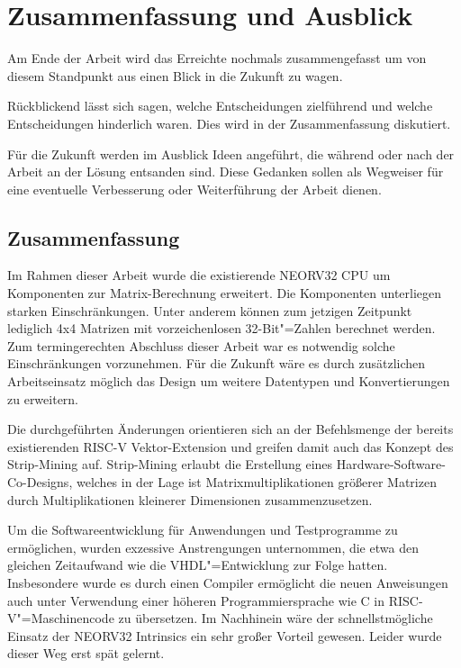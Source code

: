 \chapter{Zusammenfassung und Ausblick} \label{chpt:Zusammenfassung_und_Ausblick_Main}

Am Ende der Arbeit wird das Erreichte nochmals zusammengefasst um von diesem Standpunkt aus einen Blick in die Zukunft zu wagen.

Rückblickend lässt sich sagen, welche Entscheidungen zielführend und welche Entscheidungen hinderlich waren. Dies wird in der Zusammenfassung diskutiert.

Für die Zukunft werden im Ausblick Ideen angeführt, die während oder nach der Arbeit an der Lösung entsanden sind. Diese Gedanken sollen als Wegweiser für eine eventuelle Verbesserung oder Weiterführung der Arbeit dienen.




\section{Zusammenfassung} \label{sec:summary}

Im Rahmen dieser Arbeit wurde die existierende NEORV32 CPU um Komponenten zur Matrix-Berechnung erweitert. Die Komponenten unterliegen starken Einschränkungen. Unter anderem können zum jetzigen Zeitpunkt lediglich 4x4 Matrizen mit vorzeichenlosen 32-Bit"=Zahlen berechnet werden. Zum termingerechten Abschluss dieser Arbeit war es notwendig solche Einschränkungen vorzunehmen. Für die Zukunft wäre es durch zusätzlichen Arbeitseinsatz möglich das Design um weitere Datentypen und Konvertierungen zu erweitern.

Die durchgeführten Änderungen orientieren sich an der Befehlsmenge der bereits existierenden RISC-V Vektor-Extension und greifen damit auch das Konzept des Strip-Mining auf. Strip-Mining erlaubt die Erstellung eines Hardware-Software-Co-Designs, welches in der Lage ist Matrixmultiplikationen größerer Matrizen durch Multiplikationen kleinerer Dimensionen zusammenzusetzen.

Um die Softwareentwicklung für Anwendungen und Testprogramme zu ermöglichen, wurden exzessive Anstrengungen unternommen, die etwa den gleichen Zeitaufwand wie die VHDL"=Entwicklung zur Folge hatten. Insbesondere wurde es durch einen Compiler ermöglicht die neuen Anweisungen auch unter Verwendung einer höheren Programmiersprache wie C in RISC-V"=Maschinencode zu übersetzen. Im Nachhinein wäre der schnellstmögliche Einsatz der NEORV32 Intrinsics ein sehr großer Vorteil gewesen. Leider wurde dieser Weg erst spät gelernt.

